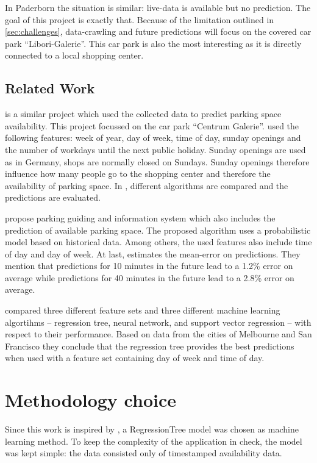 \documentclass[journal,10pt]{IEEEtran}
\begin{document}
In Paderborn the situation is similar: live-data is available but no prediction. The goal of this project is exactly that. Because of the limitation outlined in \ref{sec:challenges}, data-crawling and future predictions will focus on the covered car park ``Libori-Galerie''. This car park is also the most interesting as it is directly connected to a local shopping center. 


\subsection{Related Work}
\cite{parkendd} is a similar project which used the collected data to predict parking space availability. This project focussed on the car park ``Centrum Galerie''. \cite{parkendd} used the following features: week of year, day of week, time of day, sunday openings and the number of workdays until the next public holiday. Sunday openings are used as in Germany, shops are normally closed on Sundays. Sunday openings therefore influence how many people go to the shopping center and therefore the availability of parking space. In \cite{parkendd}, different algorithms are compared and the predictions are evaluated.

\cite{Rajabioun2013} propose parking guiding and
information system which also includes the prediction of available parking space. The proposed algorithm uses a probabilistic model based on historical data. Among others, the used features also include time of day and day of week. At last, \cite{Rajabioun2013} estimates the mean-error on predictions. They mention that predictions for 10 minutes in the future lead to a 1.2\% error on average while predictions for 40 minutes in the future lead to a 2.8\% error on average.

\cite{Zheng2015} compared three different feature sets and three different machine learning algortihms -- regression tree, neural network, and support vector regression -- with respect to their performance. Based on data from the cities of Melbourne and San Francisco they conclude that the regression tree provides the best predictions when used with a feature set containing day of week and time of day.  


\section{Methodology choice}

Since this work is inspired by \cite{parkendd}, a RegressionTree model was chosen as machine learning method. To keep the complexity of the application in check, the model was kept simple: the data consisted only of timestamped availability data.
\end{document}
